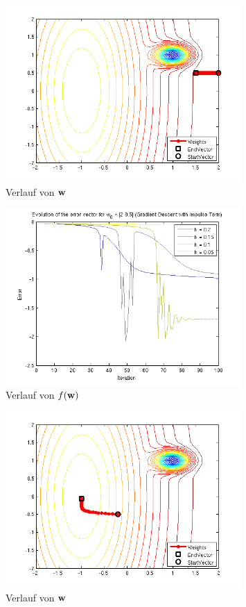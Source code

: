 \begin{figure}[h!]
  \centering
  \includegraphics[width=0.8\textwidth]{./figures/212/path_w01_eta005.png}
  \caption{Verlauf von $\mathbf{w}$}
  \label{fig:impulse_path_w01_eta005}
\end{figure}

\begin{figure}[h!]
  \centering
  \includegraphics[width=0.8\textwidth]{./figures/212/error_w01.png}
  \caption{Verlauf von $f(\mathbf{w})$}
  \label{fig:impulse_error_w01}
\end{figure}

\begin{figure}[h!]
  \centering
  \includegraphics[width=0.8\textwidth]{./figures/212/path_w02_eta02.png}
  \caption{Verlauf von $\mathbf{w}$}
  \label{fig:impulse_path_w02_eta02}
\end{figure}

